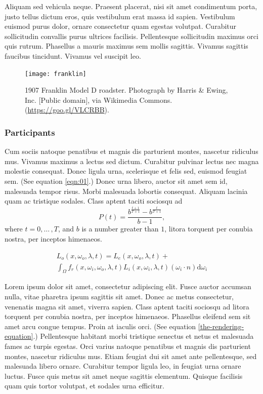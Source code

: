 \documentclass[acmtog]{acmart}
\begin{document}
Aliquam sed vehicula neque. Praesent placerat, nisi sit amet condimentum porta, justo tellus dictum eros, quis vestibulum erat massa id sapien. Vestibulum euismod purus dolor, ornare consectetur quam egestas volutpat. Curabitur sollicitudin convallis purus ultrices facilisis. Pellentesque sollicitudin maximus orci quis rutrum. Phasellus a mauris maximus sem mollis sagittis. Vivamus sagittis faucibus tincidunt. Vivamus vel suscipit leo.

\begin{figure}[h]
  \centering
  \texttt{[image: franklin]}
  \caption{1907 Franklin Model D roadster. Photograph by Harris \& Ewing, Inc. [Public domain], via Wikimedia Commons. (\url{https://goo.gl/VLCRBB}).}
\end{figure}

\subsubsection{Participants}

Cum sociis natoque penatibus et magnis dis parturient montes, nascetur ridiculus mus. Vivamus maximus a lectus sed dictum. Curabitur pulvinar lectus nec magna molestie consequat. Donec ligula urna, scelerisque et felis sed, euismod feugiat sem. (See equation \ref{eqn:01}.) Donec urna libero, auctor sit amet sem id, malesuada tempor risus. Morbi malesuada lobortis consequat. Aliquam lacinia quam ac tristique sodales. Class aptent taciti sociosqu ad 
\begin{equation}
\label{eqn:01}
P(t)=\frac{b^{\frac{t+1}{T+1}}-b^{\frac{t}{T+1}}}{b-1},
\end{equation}
where $t=0,{\ldots}\,,T$, and $b$ is a number greater than $1$, litora torquent per conubia nostra, per inceptos himenaeos.

\begin{multline}
\label{the-rendering-equation}
L_o(x, \omega_o, \lambda, t) = L_e(x, \omega_o, \lambda, t)  + \\
\int_{\Omega} f_r(x, \omega_i, \omega_o, \lambda, t) L_i(x, \omega_i, \lambda, t)(\omega_i \cdot n) \text{d} \omega_i
\end{multline}

Lorem ipsum dolor sit amet, consectetur adipiscing elit. Fusce auctor accumsan nulla, vitae pharetra ipsum sagittis sit amet. Donec ac metus consectetur, venenatis magna sit amet, viverra sapien. Class aptent taciti sociosqu ad litora torquent per conubia nostra, per inceptos himenaeos. Phasellus eleifend sem sit amet arcu congue tempus. Proin at iaculis orci. (See equation \ref{the-rendering-equation}.) Pellentesque habitant morbi tristique senectus et netus et malesuada fames ac turpis egestas. Orci varius natoque penatibus et magnis dis parturient montes, nascetur ridiculus mus. Etiam feugiat dui sit amet ante pellentesque, sed malesuada libero ornare. Curabitur tempor ligula leo, in feugiat urna ornare luctus. Fusce quis metus sit amet neque sagittis elementum. Quisque facilisis quam quis tortor volutpat, et sodales urna efficitur.
\end{document}
